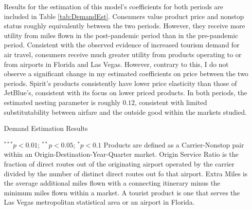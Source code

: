 \documentclass{article}
\begin{document}
    Results for the estimation of this model's coefficients for both periods are included in Table \ref{tab:DemandEst}. Consumers value product price and nonstop status roughly equivalently between the two periods. However, they receive more utility from miles flown in the post-pandemic period than in the pre-pandemic period. Consistent with the observed evidence of increased tourism demand for air travel, consumers receive much greater utility from products operating to or from airports in Florida and Las Vegas. However, contrary to this, I do not observe a significant change in my estimated coefficients on price between the two periods. Spirit's products consistently have lower price elasticity than those of JetBlue's, consistent with its focus on lower priced products. In both periods, the estimated nesting parameter is roughly $0.12$, consistent with limited substitutability between airfare and the outside good within the markets studied.

    \begin{table}
        \caption{Demand Estimation Results}
        \label{tab:DemandEst}
        \begin{center}
        
        \end{center}
        \footnotesize{$^{***}p<0.01$; $^{**}p<0.05$; $^{*}p<0.1$ Products are defined as a Carrier-Nonstop pair within an Origin-Destination-Year-Quarter market. Origin Service Ratio is the fraction of direct routes out of the originating airport operated by the carrier divided by the number of distinct direct routes out fo that airport. Extra Miles is the average additional miles flown with a connecting itinerary minus the minimum miles flown within a market.  A tourist product is one that serves the Las Vegas metropolitan statistical area or an airport in Florida.}
    \end{table}
	
	
\end{document}
